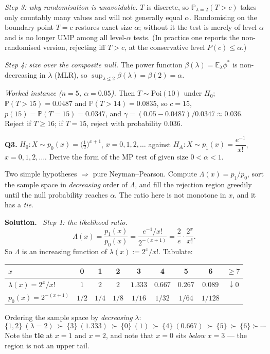 \documentclass[11pt]{article}
\newcommand{\E}{\mathbb{E}}
\newcommand{\Prob}{\mathbb{P}}
\newenvironment{prob}[1]{\medskip\noindent\textbf{\large #1}\quad}{\par}
\newcommand{\soln}{\medskip\noindent\textbf{Solution.}\ }
\begin{document}
\emph{Step 3: why randomisation is unavoidable.} $T$ is discrete, so
$\Prob_{\lambda=2}(T>c)$ takes only countably many values and will not generally equal
$\alpha$. Randomising on the boundary point $T=c$ restores exact size $\alpha$; without it the
test is merely of level $\alpha$ and is no longer UMP among all level-$\alpha$ tests. (In
practice one reports the non-randomised version, rejecting iff $T>c$, at the conservative
level $P(c)\le\alpha$.)

\emph{Step 4: size over the composite null.} The power function
$\beta(\lambda)=\E_\lambda\phi^*$ is non-decreasing in $\lambda$ (MLR), so
$\sup_{\lambda\le2}\beta(\lambda)=\beta(2)=\alpha$.

\emph{Worked instance ($n=5$, $\alpha=0.05$).} Then $T\sim\mathrm{Poi}(10)$ under $H_0$;
$\Prob(T>15)=0.0487$ and $\Prob(T>14)=0.0835$, so $c=15$,
$p(15)=\Prob(T=15)=0.0347$, and
$\gamma=(0.05-0.0487)/0.0347\approx0.036$. Reject if $T\ge16$; if $T=15$, reject with
probability $0.036$.

\bigskip
\begin{prob}{Q3.}
$H_0: X\sim p_0(x)=\big(\tfrac12\big)^{x+1}$, $x=0,1,2,\dots$ against
$H_A: X\sim p_1(x)=\dfrac{e^{-1}}{x!}$, $x=0,1,2,\dots$. Derive the form of the MP test of
given size $0<\alpha<1$.
\end{prob}

\begin{ideabox}
Two simple hypotheses $\Rightarrow$ pure Neyman--Pearson. Compute $\Lambda(x)=p_1/p_0$, sort
the sample space in \emph{decreasing} order of $\Lambda$, and fill the rejection region greedily
until the null probability reaches $\alpha$. The ratio here is not monotone in $x$, and it has
a \emph{tie}.
\end{ideabox}

\soln
\emph{Step 1: the likelihood ratio.}
\[
\Lambda(x)=\frac{p_1(x)}{p_0(x)}=\frac{e^{-1}/x!}{2^{-(x+1)}}
=\frac{2}{e}\cdot\frac{2^{x}}{x!} .
\]
So $\Lambda$ is an increasing function of $\lambda(x):=2^x/x!$. Tabulate:
\begin{center}
\renewcommand{\arraystretch}{1.25}
\begin{tabular}{@{}lcccccccc@{}}
\toprule
$x$ & 0 & 1 & 2 & 3 & 4 & 5 & 6 & $\ge7$ \\
\midrule
$\lambda(x)=2^x/x!$ & $1$ & $2$ & $2$ & $1.333$ & $0.667$ & $0.267$ & $0.089$ & $\downarrow 0$ \\
$p_0(x)=2^{-(x+1)}$ & $1/2$ & $1/4$ & $1/8$ & $1/16$ & $1/32$ & $1/64$ & $1/128$ & \\
\bottomrule
\end{tabular}
\end{center}
Ordering the sample space by \emph{decreasing} $\lambda$:
\[
\{1,2\}\ (\lambda=2)\ \succ\ \{3\}\ (1.333)\ \succ\ \{0\}\ (1)\ \succ\ \{4\}\ (0.667)\ \succ\ \{5\}\ \succ\ \{6\}\succ\cdots
\]
Note the \textbf{tie} at $x=1$ and $x=2$, and note that $x=0$ sits \emph{below} $x=3$ --- the
region is not an upper tail.
\end{document}
